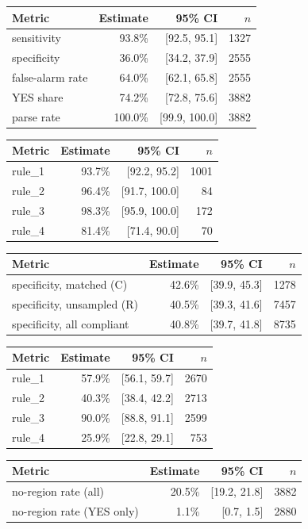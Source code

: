 \begin{tabular}{lrrr}
\toprule
Metric & Estimate & 95\% CI & $n$ \\
\midrule
sensitivity & 93.8\% & [92.5, 95.1] & 1327 \\
specificity & 36.0\% & [34.2, 37.9] & 2555 \\
false-alarm rate & 64.0\% & [62.1, 65.8] & 2555 \\
YES share & 74.2\% & [72.8, 75.6] & 3882 \\
parse rate & 100.0\% & [99.9, 100.0] & 3882 \\
\bottomrule
\end{tabular}

\begin{tabular}{lrrr}
\toprule
Metric & Estimate & 95\% CI & $n$ \\
\midrule
rule\_1 & 93.7\% & [92.2, 95.2] & 1001 \\
rule\_2 & 96.4\% & [91.7, 100.0] & 84 \\
rule\_3 & 98.3\% & [95.9, 100.0] & 172 \\
rule\_4 & 81.4\% & [71.4, 90.0] & 70 \\
\bottomrule
\end{tabular}

\begin{tabular}{lrrr}
\toprule
Metric & Estimate & 95\% CI & $n$ \\
\midrule
specificity, matched (C) & 42.6\% & [39.9, 45.3] & 1278 \\
specificity, unsampled (R) & 40.5\% & [39.3, 41.6] & 7457 \\
specificity, all compliant & 40.8\% & [39.7, 41.8] & 8735 \\
\bottomrule
\end{tabular}

\begin{tabular}{lrrr}
\toprule
Metric & Estimate & 95\% CI & $n$ \\
\midrule
rule\_1 & 57.9\% & [56.1, 59.7] & 2670 \\
rule\_2 & 40.3\% & [38.4, 42.2] & 2713 \\
rule\_3 & 90.0\% & [88.8, 91.1] & 2599 \\
rule\_4 & 25.9\% & [22.8, 29.1] & 753 \\
\bottomrule
\end{tabular}

\begin{tabular}{lrrr}
\toprule
Metric & Estimate & 95\% CI & $n$ \\
\midrule
no-region rate (all) & 20.5\% & [19.2, 21.8] & 3882 \\
no-region rate (YES only) & 1.1\% & [0.7, 1.5] & 2880 \\
\bottomrule
\end{tabular}


